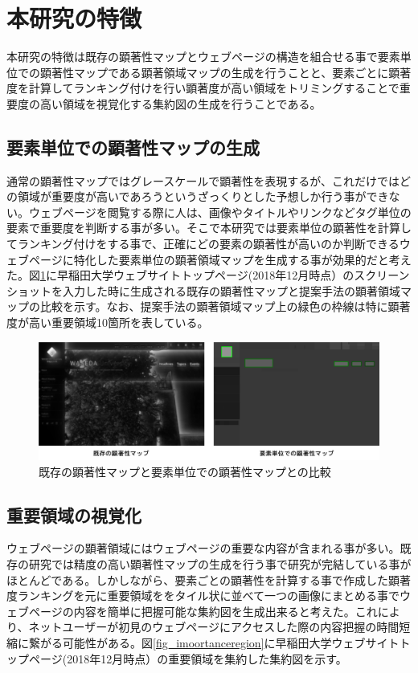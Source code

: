 \newpage
\renewcommand{\baselinestretch}{1.5}
\section{本研究の特徴}
\renewcommand{\baselinestretch}{1}
\par 本研究の特徴は既存の顕著性マップとウェブページの構造を組合せる事で要素単位での顕著性マップである顕著領域マップの生成を行うことと、要素ごとに顕著度を計算してランキング付けを行い顕著度が高い領域をトリミングすることで重要度の高い領域を視覚化する集約図の生成を行うことである。

\subsection{要素単位での顕著性マップの生成}
\par 通常の顕著性マップではグレースケールで顕著性を表現するが、これだけではどの領域が重要度が高いであろうというざっくりとした予想しか行う事ができない。ウェブページを閲覧する際に人は、画像やタイトルやリンクなどタグ単位の要素で重要度を判断する事が多い。そこで本研究では要素単位の顕著性を計算してランキング付けをする事で、正確にどの要素の顕著性が高いのか判断できるウェブページに特化した要素単位の顕著領域マップを生成する事が効果的だと考えた。図\ref{fig_comparesaliency}に早稲田大学ウェブサイトトップページ(2018年12月時点）\cite{waseda_top}のスクリーンショットを入力した時に生成される既存の顕著性マップと提案手法の顕著領域マップの比較を示す。なお、提案手法の顕著領域マップ上の緑色の枠線は特に顕著度が高い重要領域10箇所を表している。

\begin{figure}[H]
    \centering
    \includegraphics[width=12cm]{figures/example-originalsaliencymap.png}
    \caption{既存の顕著性マップと要素単位での顕著性マップとの比較}
    \label{fig_comparesaliency}
\end{figure}

\subsection{重要領域の視覚化}
\par ウェブページの顕著領域にはウェブページの重要な内容が含まれる事が多い。既存の研究では精度の高い顕著性マップの生成を行う事で研究が完結している事がほとんどである。しかしながら、要素ごとの顕著性を計算する事で作成した顕著度ランキングを元に重要領域ををタイル状に並べて一つの画像にまとめる事でウェブページの内容を簡単に把握可能な集約図を生成出来ると考えた。これにより、ネットユーザーが初見のウェブページにアクセスした際の内容把握の時間短縮に繋がる可能性がある。図\ref{fig_imoortanceregion}に早稲田大学ウェブサイトトップページ(2018年12月時点）\cite{waseda_top}の重要領域を集約した集約図を示す。

